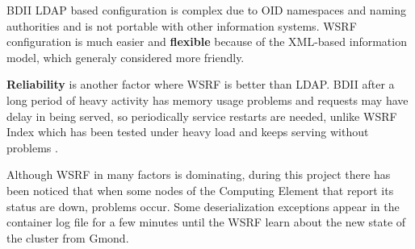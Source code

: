 BDII LDAP based configuration is complex due to OID namespaces and naming authorities and is not portable with other information systems. WSRF configuration is much easier and {\bf flexible} because of the XML-based information model, which generaly considered more friendly.

{\bf Reliability} is another factor where WSRF is better than LDAP. BDII after a long period of heavy activity has memory usage problems and requests may have delay in being served, so periodically service restarts are needed, unlike WSRF Index which has been tested under heavy load and keeps serving without problems \cite{schopf2006monitoring}.

Although WSRF in many factors is dominating, during this project there has been noticed that when some nodes of the Computing Element that report its status are down, problems occur. Some deserialization exceptions appear in the container log file for a few minutes until the WSRF learn about the new state of the cluster from Gmond.

